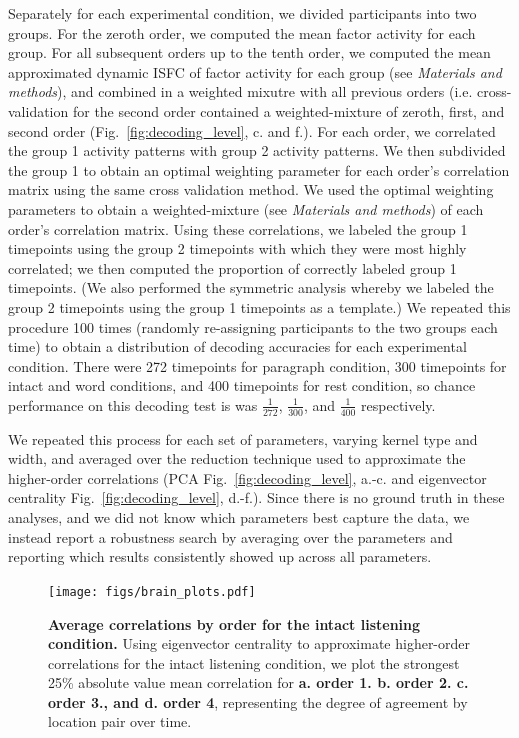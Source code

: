\documentclass[english]{article}
\begin{document}
Separately for each experimental condition, we divided participants
into two groups. For the zeroth order, we computed the mean factor
activity for each group.  For all subsequent orders up to the tenth
order, we computed the mean approximated dynamic ISFC of factor
activity for each group (see \textit{Materials and methods}), and
combined in a weighted mixutre with all previous orders
(i.e. cross-validation for the second
order contained a weighted-mixture of zeroth, first, and second order
(Fig.~\ref{fig:decoding_level}, c. and f.).  For
each order, we correlated the group 1 activity patterns with group 2
activity patterns.  We then subdivided the group 1 to obtain an
optimal weighting parameter for each order’s correlation matrix using
the same cross validation method. We used the optimal weighting
parameters to obtain a weighted-mixture (see \textit{Materials and methods}) of each order’s correlation
matrix. Using these correlations, we labeled the group 1 timepoints
using the group 2 timepoints with which they were most highly
correlated; we then computed the proportion of correctly labeled group
1 timepoints. (We also performed the symmetric analysis whereby we
labeled the group 2 timepoints using the group 1 timepoints as a
template.) We repeated this procedure 100 times (randomly re-assigning
participants to the two groups each time) to obtain a distribution of
decoding accuracies for each experimental condition. There were 272
timepoints for paragraph condition, 300 timepoints for intact and word
conditions, and 400 timepoints for rest condition,  so chance
performance on this decoding test is was $\frac{1}{272}$,
$\frac{1}{300}$, and $\frac{1}{400}$ respectively.
 
We repeated this process for each set of parameters, varying kernel
type and width, and averaged over the reduction technique used to
approximate the higher-order correlations (PCA Fig.~\ref{fig:decoding_level},  a.-c. and eigenvector
centrality Fig.~\ref{fig:decoding_level},  d.-f.).  Since there is no ground truth in these analyses, and we did not know
which parameters best capture the data, we instead report a robustness
search by averaging over the parameters and reporting which results
consistently showed up across all parameters.
\begin{figure}
  \centering
  \texttt{[image: figs/brain\_plots.pdf]}
  \caption{\textbf{Average correlations by order for the intact listening condition.} Using eigenvector
    centrality to approximate higher-order correlations for the intact
    listening condition, we plot the
    strongest 25\% absolute value
    mean correlation for \textbf{a. order 1. b. order 2. c. order 3.,
      and d. order 4}, representing the degree of agreement by
    location pair over time.}
  \label{fig:brain_plots}
\end{figure}
\end{document}

